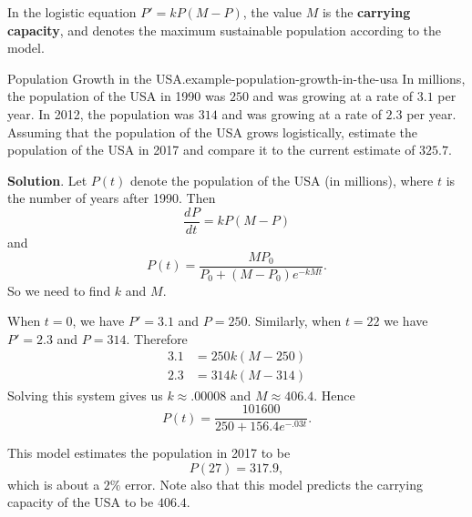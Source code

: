 \documentclass[10pt,]{book}
\newcommand{\terminology}[1]{\textbf{#1}}
\numberwithin{equation}{section}
\newcommand{\dv}[3][]{\dfrac{d^{#1} #2}{d #3^{#1}}}
\begin{document}
\hypertarget{p-747}{}%
In the logistic equation \(P' = kP(M-P)\), the value \(M\) is the \terminology{carrying capacity}, and denotes the maximum sustainable population according to the model.%
\begin{example}{Population Growth in the USA.}{example-population-growth-in-the-usa}%
\hypertarget{p-748}{}%
In millions, the population of the USA in 1990 was \(250\) and was growing at a rate of \(3.1\) per year. In 2012, the population was \(314\) and was growing at a rate of \(2.3\) per year. Assuming that the population of the USA grows logistically, estimate the population of the USA in 2017 and compare it to the current estimate of \(325.7\).%
\par\smallskip%
\noindent\textbf{Solution}.\hypertarget{solution-157}{}\quad%
\hypertarget{p-749}{}%
Let \(P(t)\) denote the population of the USA (in millions), where \(t\) is the number of years after 1990. Then%
\begin{equation*}
\dv{P}{t} = kP(M-P)
\end{equation*}
and%
\begin{equation*}
P(t) = \frac{MP_{0}}{P_{0} + (M - P_{0})e^{-kMt}}.
\end{equation*}
So we need to find \(k\) and \(M\).%
\par
\hypertarget{p-750}{}%
When \(t = 0\), we have \(P' = 3.1\) and \(P = 250\). Similarly, when \(t = 22\) we have \(P' = 2.3\) and \(P = 314\). Therefore%
\begin{align*}
3.1 & = 250k(M - 250) \\
2.3 & = 314k(M - 314) 
\end{align*}
Solving this system gives us \(k\approx.00008\) and \(M \approx 406.4\). Hence%
\begin{equation*}
P(t) = \frac{101600}{250 + 156.4e^{-.03t}}.
\end{equation*}
%
\par
\hypertarget{p-751}{}%
This model estimates the population in 2017 to be%
\begin{equation*}
P(27) = 317.9,
\end{equation*}
which is about a \(2\%\) error. Note also that this model predicts the carrying capacity of the USA to be \(406.4\).%
\end{example}
%
%
\typeout{************************************************}
\typeout{************************************************}
%
\end{document}
